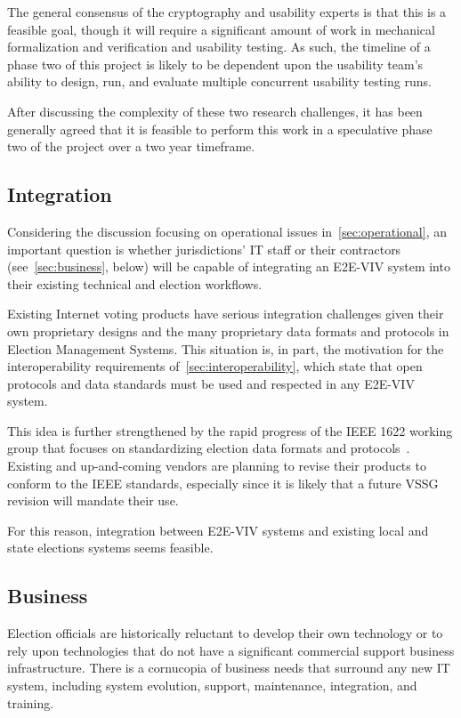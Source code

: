 The general consensus of the cryptography and usability experts is
that this is a feasible goal, though it will require a significant
amount of work in mechanical formalization and verification and
usability testing. As such, the timeline of a phase two of this
project is likely to be dependent upon the usability team's ability to
design, run, and evaluate multiple concurrent usability testing runs.

After discussing the complexity of these two research challenges, it
has been generally agreed that it is feasible to perform this work in
a speculative phase two of the project over a two year timeframe.

\subsection{Integration}

Considering the discussion focusing on operational issues
in~\autoref{sec:operational}, an important question is whether
jurisdictions' IT staff or their contractors
(see~\autoref{sec:business}, below) will be capable of integrating an
E2E-VIV system into their existing technical and election workflows.

Existing Internet voting products have serious integration challenges
given their own proprietary designs and the many proprietary data
formats and protocols in Election Management Systems.  This situation
is, in part, the motivation for the interoperability requirements
of~\autoref{sec:interoperability}, which state that open protocols and
data standards must be used and respected in any E2E-VIV system.

This idea is further strengthened by the rapid progress of the IEEE
1622 working group that focuses on standardizing election data formats
and protocols~\cite{IEEE1622}. Existing and up-and-coming vendors are
planning to revise their products to conform to the IEEE standards,
especially since it is likely that a future VSSG revision will mandate
their use.

For this reason, integration between E2E-VIV systems and existing
local and state elections systems seems feasible.

\subsection{Business}
\label{sec:business}

Election officials are historically reluctant to develop their own
technology or to rely upon technologies that do not have a significant
commercial support business infrastructure. There is a cornucopia of
business needs that surround any new IT system, including system
evolution, support, maintenance, integration, and training.


